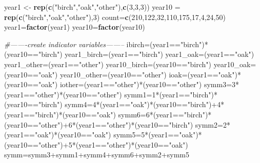 \documentclass[]{article}
\newenvironment{Shaded}{\begin{snugshade}}{\end{snugshade}}
\newcommand{\KeywordTok}[1]{\textcolor[rgb]{0.26,0.66,0.93}{\textbf{{#1}}}}
\newcommand{\DecValTok}[1]{\textcolor[rgb]{0.27,0.67,0.26}{{#1}}}
\newcommand{\StringTok}[1]{\textcolor[rgb]{0.02,0.61,0.04}{{#1}}}
\newcommand{\CommentTok}[1]{\textcolor[rgb]{0.00,0.40,1.00}{\textit{{#1}}}}
\newcommand{\NormalTok}[1]{\textcolor[rgb]{0.74,0.68,0.62}{{#1}}}
\begin{document}
\begin{Shaded}
\begin{Highlighting}[]
\NormalTok{year1 <-}\StringTok{ }\KeywordTok{rep}\NormalTok{(}\KeywordTok{c}\NormalTok{(}\StringTok{"birch"}\NormalTok{,}\StringTok{"oak"}\NormalTok{,}\StringTok{"other"}\NormalTok{),}\KeywordTok{c}\NormalTok{(}\DecValTok{3}\NormalTok{,}\DecValTok{3}\NormalTok{,}\DecValTok{3}\NormalTok{))}
\NormalTok{year10 =}\StringTok{ }\KeywordTok{rep}\NormalTok{(}\KeywordTok{c}\NormalTok{(}\StringTok{"birch"}\NormalTok{,}\StringTok{"oak"}\NormalTok{,}\StringTok{"other"}\NormalTok{),}\DecValTok{3}\NormalTok{)}
\NormalTok{count=}\KeywordTok{c}\NormalTok{(}\DecValTok{210}\NormalTok{,}\DecValTok{122}\NormalTok{,}\DecValTok{32}\NormalTok{,}\DecValTok{110}\NormalTok{,}\DecValTok{175}\NormalTok{,}\DecValTok{17}\NormalTok{,}\DecValTok{4}\NormalTok{,}\DecValTok{24}\NormalTok{,}\DecValTok{50}\NormalTok{)}
\NormalTok{year1=}\KeywordTok{factor}\NormalTok{(year1)}
\NormalTok{year10=}\KeywordTok{factor}\NormalTok{(year10)}

\CommentTok{#-------create indicator variables--------}
\NormalTok{ibirch=(year1==}\StringTok{"birch"}\NormalTok{)*(year10==}\StringTok{"birch"}\NormalTok{)}
\NormalTok{year1_birch=(year1==}\StringTok{"birch"}\NormalTok{)}
\NormalTok{year1_oak=(year1==}\StringTok{"oak"}\NormalTok{)}
\NormalTok{year1_other=(year1==}\StringTok{"other"}\NormalTok{)}
\NormalTok{year10_birch=(year10==}\StringTok{"birch"}\NormalTok{)}
\NormalTok{year10_oak=(year10==}\StringTok{"oak"}\NormalTok{)}
\NormalTok{year10_other=(year10==}\StringTok{"other"}\NormalTok{)}
\NormalTok{ioak=(year1==}\StringTok{"oak"}\NormalTok{)*(year10==}\StringTok{"oak"}\NormalTok{)}
\NormalTok{iother=(year1==}\StringTok{"other"}\NormalTok{)*(year10==}\StringTok{"other"}\NormalTok{)}
\NormalTok{symm3=}\DecValTok{3}\NormalTok{*(year1==}\StringTok{"other"}\NormalTok{)*(year10==}\StringTok{"other"}\NormalTok{)}
\NormalTok{symm1=}\DecValTok{1}\NormalTok{*(year1==}\StringTok{"birch"}\NormalTok{)*(year10==}\StringTok{"birch"}\NormalTok{)}
\NormalTok{symm4=}\DecValTok{4}\NormalTok{*(year1==}\StringTok{"oak"}\NormalTok{)*(year10==}\StringTok{"birch"}\NormalTok{)+}\DecValTok{4}\NormalTok{*(year1==}\StringTok{"birch"}\NormalTok{)*(year10==}\StringTok{"oak"}\NormalTok{)}
\NormalTok{symm6=}\DecValTok{6}\NormalTok{*(year1==}\StringTok{"birch"}\NormalTok{)*(year10==}\StringTok{"other"}\NormalTok{)+}\DecValTok{6}\NormalTok{*(year1==}\StringTok{"other"}\NormalTok{)*(year10==}\StringTok{"birch"}\NormalTok{)}
\NormalTok{symm2=}\DecValTok{2}\NormalTok{*(year1==}\StringTok{"oak"}\NormalTok{)*(year10==}\StringTok{"oak"}\NormalTok{)}
\NormalTok{symm5=}\DecValTok{5}\NormalTok{*(year1==}\StringTok{"oak"}\NormalTok{)*(year10==}\StringTok{"other"}\NormalTok{)+}\DecValTok{5}\NormalTok{*(year1==}\StringTok{"other"}\NormalTok{)*(year10==}\StringTok{"oak"}\NormalTok{)}
\NormalTok{symm=symm3+symm1+symm4+symm6+symm2+symm5}


\end{Highlighting}
\end{Shaded}
\end{document}
